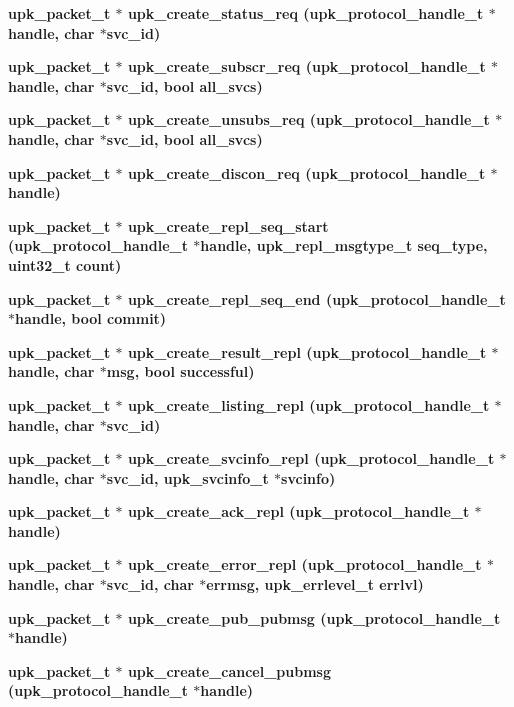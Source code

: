 \begin{CompactItemize}
\item 
\bf{upk\_\-packet\_\-t} $\ast$ \bf{upk\_\-create\_\-status\_\-req} (\bf{upk\_\-protocol\_\-handle\_\-t} $\ast$handle, char $\ast$svc\_\-id)
\item 
\bf{upk\_\-packet\_\-t} $\ast$ \bf{upk\_\-create\_\-subscr\_\-req} (\bf{upk\_\-protocol\_\-handle\_\-t} $\ast$handle, char $\ast$svc\_\-id, bool all\_\-svcs)
\item 
\bf{upk\_\-packet\_\-t} $\ast$ \bf{upk\_\-create\_\-unsubs\_\-req} (\bf{upk\_\-protocol\_\-handle\_\-t} $\ast$handle, char $\ast$svc\_\-id, bool all\_\-svcs)
\item 
\bf{upk\_\-packet\_\-t} $\ast$ \bf{upk\_\-create\_\-discon\_\-req} (\bf{upk\_\-protocol\_\-handle\_\-t} $\ast$handle)
\item 
\bf{upk\_\-packet\_\-t} $\ast$ \bf{upk\_\-create\_\-repl\_\-seq\_\-start} (\bf{upk\_\-protocol\_\-handle\_\-t} $\ast$handle, \bf{upk\_\-repl\_\-msgtype\_\-t} seq\_\-type, uint32\_\-t count)
\item 
\bf{upk\_\-packet\_\-t} $\ast$ \bf{upk\_\-create\_\-repl\_\-seq\_\-end} (\bf{upk\_\-protocol\_\-handle\_\-t} $\ast$handle, bool commit)
\item 
\bf{upk\_\-packet\_\-t} $\ast$ \bf{upk\_\-create\_\-result\_\-repl} (\bf{upk\_\-protocol\_\-handle\_\-t} $\ast$handle, char $\ast$msg, bool successful)
\item 
\bf{upk\_\-packet\_\-t} $\ast$ \bf{upk\_\-create\_\-listing\_\-repl} (\bf{upk\_\-protocol\_\-handle\_\-t} $\ast$handle, char $\ast$svc\_\-id)
\item 
\bf{upk\_\-packet\_\-t} $\ast$ \bf{upk\_\-create\_\-svcinfo\_\-repl} (\bf{upk\_\-protocol\_\-handle\_\-t} $\ast$handle, char $\ast$svc\_\-id, \bf{upk\_\-svcinfo\_\-t} $\ast$svcinfo)
\item 
\bf{upk\_\-packet\_\-t} $\ast$ \bf{upk\_\-create\_\-ack\_\-repl} (\bf{upk\_\-protocol\_\-handle\_\-t} $\ast$handle)
\item 
\bf{upk\_\-packet\_\-t} $\ast$ \bf{upk\_\-create\_\-error\_\-repl} (\bf{upk\_\-protocol\_\-handle\_\-t} $\ast$handle, char $\ast$svc\_\-id, char $\ast$errmsg, \bf{upk\_\-errlevel\_\-t} errlvl)
\item 
\bf{upk\_\-packet\_\-t} $\ast$ \bf{upk\_\-create\_\-pub\_\-pubmsg} (\bf{upk\_\-protocol\_\-handle\_\-t} $\ast$handle)
\item 
\bf{upk\_\-packet\_\-t} $\ast$ \bf{upk\_\-create\_\-cancel\_\-pubmsg} (\bf{upk\_\-protocol\_\-handle\_\-t} $\ast$handle)
\end{CompactItemize}


